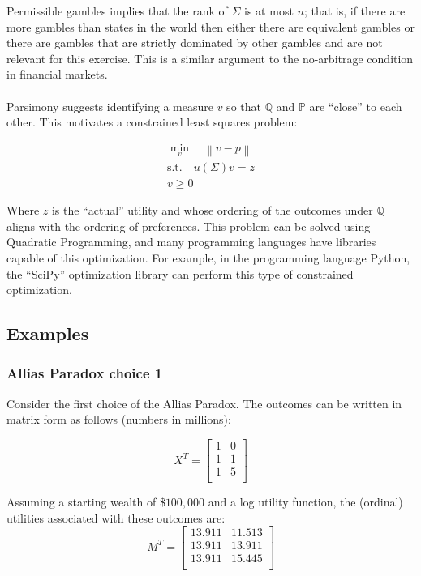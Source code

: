 \documentclass{article}
\newcommand{\norm}[1]{\left\lVert#1\right\rVert}
\begin{document}
Permissible gambles implies that the rank of \(\Sigma\) is at most \(n\); that is, if there are more gambles than states in the world then either there are equivalent gambles or there are gambles that are strictly dominated by other gambles and are not relevant for this exercise.  This is a similar argument to the no-arbitrage condition in financial markets.  
\\
\\
Parsimony suggests identifying a measure \(v\) so that \(\mathbb{Q}\) and \(\mathbb{P}\) are ``close'' to each other.  This motivates a constrained least squares problem:

\begin{equation}
\begin{aligned}
\min_v \quad \norm{v-p} \\
\textrm{s.t.}\quad u(\Sigma) v = z\\
v \geq 0
\end{aligned}
\end{equation}

Where \(z\) is the ``actual'' utility and whose ordering of the outcomes under \(\mathbb{Q}\) aligns with the ordering of preferences.  This problem can be solved using Quadratic Programming, and many programming languages have libraries capable of this optimization. For example, in the programming language Python, the ``SciPy'' optimization library can perform this type of constrained optimization.

\subsection{Examples}

\subsubsection{Allias Paradox choice 1}
Consider the first choice of the Allias Paradox.  The outcomes can be written in matrix form as follows (numbers in millions):

\[X^T=\begin{bmatrix}
	1 & 0  \\
	1 & 1  \\
	1 & 5  \\
\end{bmatrix}\]

Assuming a starting wealth of \(\$100,000\) and a log utility function, the (ordinal) utilities associated with these outcomes are:
\[M^T=\begin{bmatrix}
	13.911 & 11.513  \\
	13.911 & 13.911  \\
	13.911 & 15.445  \\
\end{bmatrix}\]
\end{document}
